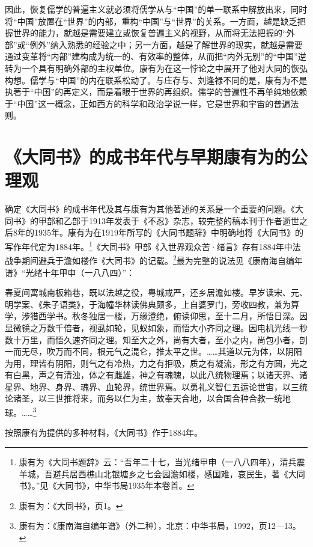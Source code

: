 \documentclass[a4paper, 12pt, openright]{ctexbook}
\renewenvironment{quote}
  {\list{}{\rightmargin2\ccwd \leftmargin2\ccwd \itemindent=2\ccwd \listparindent=2\ccwd}%
   \item\relax\small\kaishu\color{black}}
  {\endlist}
\begin{document}
因此，恢复儒学的普遍主义就必须将儒学从与“中国”的单一联系中解放出来，同时将“中国”放置在“世界”的内部，重构“中国”与“世界”的关系。一方面，越是缺乏把握世界的能力，就越是需要建立或恢复普遍主义的视野，从而将无法把握的“外部”或“例外”纳入熟悉的经验之中；另一方面，越是了解世界的现实，就越是需要通过变革将“内部”建构成为统一的、有效率的整体，从而把“内外无别”的“中国”逆转为一个具有明确外部的主权单位。康有为在这一悖论之中展开了他对大同的恢弘构想。儒学与“中国”的内在联系松动了。与庄存与、刘逢禄不同的是，康有为不是执著于“中国”的再定义，而是着眼于世界的再组织。儒学的普遍性不再单纯地依赖于“中国”这一概念，正如西方的科学和政治学说一样，它是世界和宇宙的普遍法则。

\section{《大同书》的成书年代与早期康有为的公理观}

确定《大同书》的成书年代及其与康有为其他著述的关系是一个重要的问题。《大同书》的甲部和乙部于1913年发表于《不忍》杂志，较完整的稿本刊于作者逝世之后8年的1935年。康有为在1919年所写的《大同书题辞》中明确地将《大同书》的写作年代定为1884年。\footnote{康有为《大同书题辞》云：“吾年二十七，当光绪甲申（一八八四年），清兵震羊城，吾避兵居西樵山北银塘乡之七会园澹如楼，感国难，哀民生，著《大同书》。”见《大同书》，中华书局1935年本卷首。}《大同书》甲部《入世界观众苦·绪言》存有1884年中法战争期间避兵于澹如楼作《大同书》的记载。\footnote{康有为：《大同书》，页1。}最为完整的说法见《康南海自编年谱》“光绪十年甲申（一八八四）”：

\begin{quote}
春夏间寓城南板箱巷，既以法越之役，粤城戒严，还乡居澹如楼。早岁读宋、元、明学案、《朱子语类》，于海幢华林读佛典颇多，上自婆罗门，旁收四教，兼为算学，涉猎西学书。秋冬独居一楼，万缘澄绝，俯读仰思，至十二月，所悟日深。因显微镜之万数千倍者，视虱如轮，见蚁如象，而悟大小齐同之理。因电机光线一秒数十万里，而悟久速齐同之理。知至大之外，尚有大者，至小之内，尚包小者，剖一而无尽，吹万而不同，根元气之混仑，推太平之世。……其道以元为体，以阴阳为用，理皆有阴阳，则气之有冷热，力之有拒吸，质之有凝流，形之有方圆，光之有白黑，声之有清浊，体之有雌雄，神之有魂魄，以此八统物理焉；以诸天界、诸星界、地界、身界、魂界、血轮界，统世界焉。以勇礼义智仁五运论世宙，以三统论诸圣，以三世推将来，而务以仁为主，故奉天合地，以合国合种合教一统地球。……\footnote{康有为：《康南海自编年谱》（外二种），北京：中华书局，1992，页12—13。}
\end{quote}

按照康有为提供的多种材料，《大同书》作于1884年。
\end{document}

